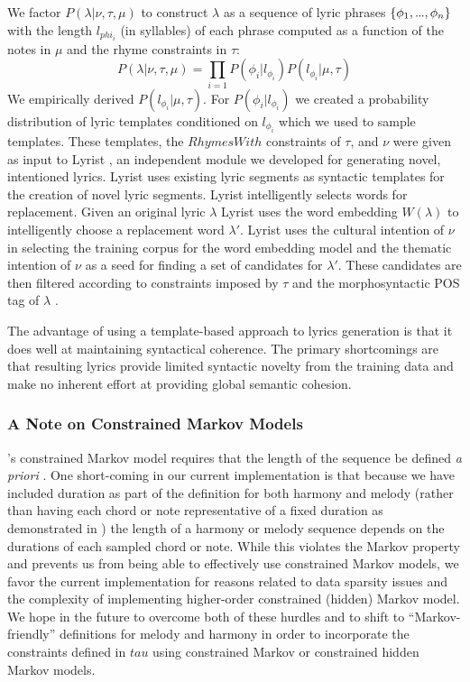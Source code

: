 \documentclass[letterpaper]{article}
\newcommand\mydots{\hbox to .75em{.\hss.\hss.}}
\begin{document}
We factor $P(\lambda|\nu,\tau,\mu)$ to construct $\lambda$ as a sequence of lyric phrases $\{\phi_1,\mydots,\phi_n\}$ with the length $l_{phi_i}$ (in syllables) of each phrase computed as a function of the notes in $\mu$ and the rhyme constraints in $\tau$:
\[ P(\lambda|\nu,\tau,\mu) = \prod_{i=1} P(\phi_i | l_{\phi_i}) P(l_{\phi_i} | \mu,\tau) \]
We empirically derived $P(l_{\phi_i} | \mu,\tau)$. For $P(\phi_i | l_{\phi_i})$ we created a probability distribution of lyric templates conditioned on $l_{\phi_i}$ which we used to sample templates. These templates, the $RhymesWith$ constraints of $\tau$, and $\nu$ were given as input to Lyrist \cite{bay:inpress-a}, an independent module we developed for generating novel, intentioned lyrics. Lyrist uses existing lyric segments as syntactic templates for the creation of novel lyric segments. Lyrist intelligently selects words for replacement. Given an original lyric $\lambda$ Lyrist uses the word embedding $W(\lambda)$ to intelligently choose a replacement word $\lambda'$. Lyrist uses the cultural intention of $\nu$ in selecting the training corpus for the word embedding model and the thematic intention of $\nu$ as a seed for finding a set of candidates for $\lambda'$. These candidates are then filtered according to constraints imposed by $\tau$ and the morphosyntactic POS tag of $\lambda$ \cite{bay:inpress-a}.

The advantage of using a template-based approach to lyrics generation is that it does well at maintaining syntactical coherence. The primary shortcomings are that resulting lyrics provide limited syntactic novelty from the training data and make no inherent effort at providing global semantic cohesion.

\subsubsection{A Note on Constrained Markov Models}

\citeauthor{pachet2001finite}'s constrained Markov model requires that the length of the sequence be defined \emph{a priori} . One short-coming in our current implementation is that because we have included duration as part of the definition for both harmony and melody (rather than having each chord or note representative of a fixed duration as demonstrated in \cite{pachet2014imitative}) the length of a harmony or melody sequence depends on the durations of each sampled chord or note. While this violates the Markov property and prevents us from being able to effectively use constrained Markov models, we favor the current implementation for reasons related to data sparsity issues and the complexity of implementing higher-order constrained (hidden) Markov model. We hope in the future to overcome both of these hurdles and to shift to ``Markov-friendly'' definitions for melody and harmony in order to incorporate the constraints defined in $tau$ using constrained Markov or constrained hidden Markov models.
\end{document}
